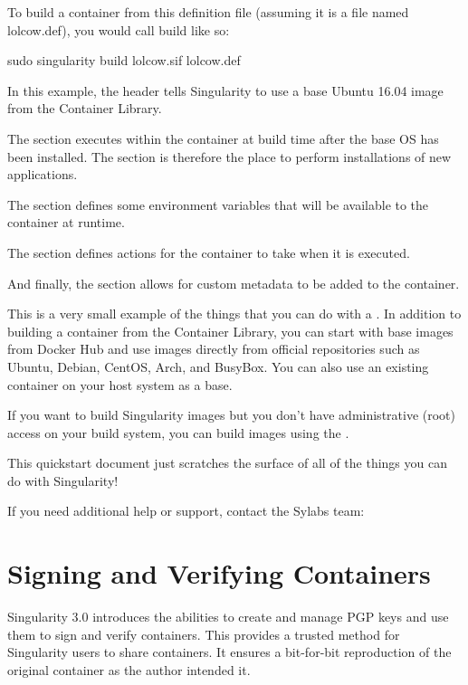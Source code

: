 \documentclass[letterpaper,10pt,english]{sphinxmanual}
\begin{document}
To build a container from this definition file (assuming it is a file
named lolcow.def), you would call build like so:

%
\begin{sphinxVerbatim}[commandchars=\\\{\}]
\PYGZdl{} sudo singularity build lolcow.sif lolcow.def
\end{sphinxVerbatim}

In this example, the header tells Singularity to use a base Ubuntu 16.04 image
from the Container Library.

The  section executes within the container at build time after the base
OS has been installed. The  section is therefore the place to perform
installations of new applications.

The  section defines some environment variables that will be
available to the container at runtime.

The  section defines actions for the container to take when it is
executed.

And finally, the  section allows for custom metadata to be added to
the container.

This is a very small example of the things that you can do with a .
In addition to building a container from the Container Library, you can start
with base images from Docker Hub and use images directly from official
repositories such as Ubuntu, Debian, CentOS, Arch, and BusyBox.  You can also
use an existing container on your host system as a base.

If you want to build Singularity images but you don’t have administrative (root)
access on your build system, you can build images using the .

This quickstart document just scratches the surface of all of the things you can
do with Singularity!

If you need additional help or support, contact the Sylabs team:


\chapter{Signing and Verifying Containers}
\label{\detokenize{signNverify:signing-and-verifying-containers}}\label{\detokenize{signNverify:signnverify}}\label{\detokenize{signNverify::doc}}\label{\detokenize{signNverify:sec-signnverify}}
Singularity 3.0 introduces the abilities to create and manage PGP keys and use
them to sign and verify containers. This provides a trusted method for
Singularity users to share containers. It ensures a bit-for-bit reproduction
of the original container as the author intended it.
\end{document}
